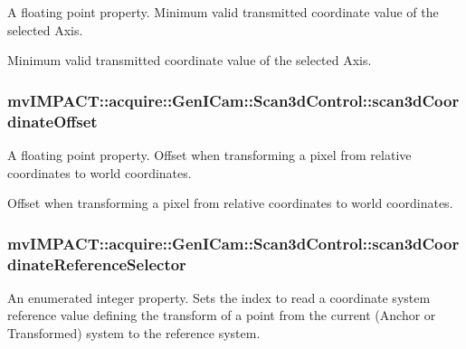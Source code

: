 A floating point property. Minimum valid transmitted coordinate value of the selected Axis. 

Minimum valid transmitted coordinate value of the selected Axis. \hypertarget{classmv_i_m_p_a_c_t_1_1acquire_1_1_gen_i_cam_1_1_scan3d_control_a530c80388f9a2aae965b15ee31f69300}{
\subsubsection[{scan3d\+Coordinate\+Offset}]{ mv\+I\+M\+P\+A\+C\+T\+::acquire\+::\+Gen\+I\+Cam\+::\+Scan3d\+Control\+::scan3d\+Coordinate\+Offset}}\label{classmv_i_m_p_a_c_t_1_1acquire_1_1_gen_i_cam_1_1_scan3d_control_a530c80388f9a2aae965b15ee31f69300}


A floating point property. Offset when transforming a pixel from relative coordinates to world coordinates. 

Offset when transforming a pixel from relative coordinates to world coordinates. \hypertarget{classmv_i_m_p_a_c_t_1_1acquire_1_1_gen_i_cam_1_1_scan3d_control_a007f2b580137fc2c75a196dcc331607a}{
\subsubsection[{scan3d\+Coordinate\+Reference\+Selector}]{ mv\+I\+M\+P\+A\+C\+T\+::acquire\+::\+Gen\+I\+Cam\+::\+Scan3d\+Control\+::scan3d\+Coordinate\+Reference\+Selector}}\label{classmv_i_m_p_a_c_t_1_1acquire_1_1_gen_i_cam_1_1_scan3d_control_a007f2b580137fc2c75a196dcc331607a}


An enumerated integer property. Sets the index to read a coordinate system reference value defining the transform of a point from the current (Anchor or Transformed) system to the reference system. 

